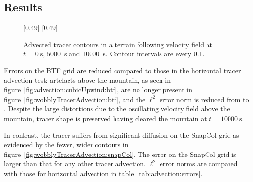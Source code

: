 \subsection{Results}

\begin{figure}
	\captionsetup[subfigure]{position=b}
	\centering
	[0.49\textwidth]{}
	\hfill
	[0.49\textwidth]{}
%
	\caption{Advected tracer contours in a terrain following velocity field at $t = \SI{0}{\second}$, \SI{5000}{\second} and \SI{10000}{\second}.  Contour intervals are every 0.1.}
\end{figure}

Errors on the BTF grid are reduced compared to those in the horizontal tracer advection test: artefacts above the mountain, as seen in figure~\ref{fig:advection:cubicUpwind:btf}, are no longer present in figure~\ref{fig:wobblyTracerAdvection:btf}, and the $\ell^2$ error norm is reduced from \unskip to \unskip.  Despite the large distortions due to the oscillating velocity field above the mountain, tracer shape is preserved having cleared the mountain at $t = \SI{10000}{\second}$.

In contrast, the tracer suffers from significant diffusion on the SnapCol grid as evidenced by the fewer, wider contours in figure~\ref{fig:wobblyTracerAdvection:snapCol}.  The error on the SnapCol grid is larger than that for any other tracer advection.  $\ell^2$ error norms are compared with those for horizontal advection in table~\ref{tab:advection:errors}.

